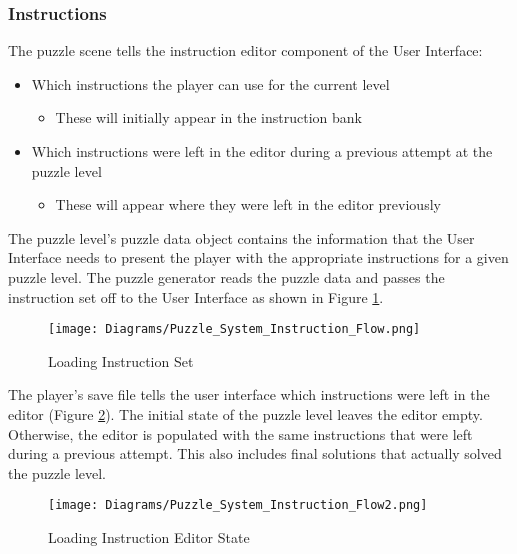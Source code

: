 \subsubsection{Instructions}
The puzzle scene tells the instruction editor component of the User Interface:
\begin{itemize}
  \item Which instructions the player can use for the current level
  \begin{itemize}
    \item These will initially appear in the instruction bank
  \end{itemize}
  \item Which instructions were left in the editor during a previous attempt at
  the puzzle level
  \begin{itemize}
    \item These will appear where they were left in the editor previously
  \end{itemize}
\end{itemize}

The puzzle level's puzzle data object contains the information that the User Interface
needs to present the player with the appropriate instructions for a given puzzle level.
The puzzle generator reads the puzzle data and passes the instruction set off to the User Interface
as shown in Figure \ref{fig:Instruction_Flow}.

\begin{figure}[!hb]
  \caption{Loading Instruction Set}
  \label{fig:Instruction_Flow}
  \centering
  \texttt{[image: Diagrams/Puzzle\_System\_Instruction\_Flow.png]}
\end{figure}

The player's save file tells the user interface which
instructions were left in the editor (Figure \ref{fig:Instruction_Flow2}). The initial state of the puzzle level leaves the
editor empty. Otherwise, the editor is populated with the same instructions that were
left during a previous attempt. This also includes final solutions that actually solved the
puzzle level.

\begin{figure}[!hb]
  \caption{Loading Instruction Editor State}
  \label{fig:Instruction_Flow2}
  \centering
  \texttt{[image: Diagrams/Puzzle\_System\_Instruction\_Flow2.png]}
\end{figure}
